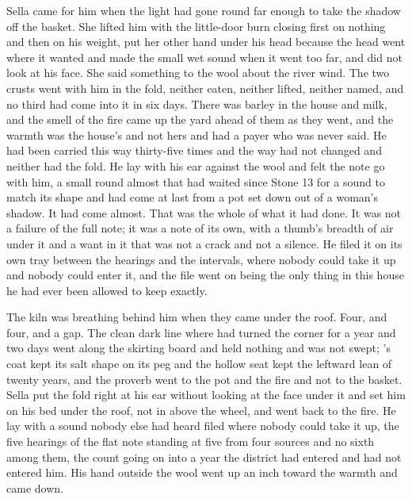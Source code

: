 Sella came for him when the light had gone round far enough to take the shadow off the basket. She lifted him with the little-door burn closing first on nothing and then on his weight, put her other hand under his head because the head went where it wanted and made the small wet sound when it went too far, and did not look at his face. She said something to the wool about the river wind. The two crusts went with him in the fold, neither eaten, neither lifted, neither named, and no third had come into it in six days. There was barley in the house and milk, and the smell of the fire came up the yard ahead of them as they went, and the warmth was the house's and not hers and had a payer who was never said. He had been carried this way thirty-five times and the way had not changed and neither had the fold. He lay with his ear against the wool and felt the note go with him, a small round almost that had waited since Stone 13 for a sound to match its shape and had come at last from a pot set down out of a woman's shadow. It had come almost. That was the whole of what it had done. It was not a failure of the full note; it was a note of its own, with a thumb's breadth of air under it and a want in it that was not a crack and not a silence. He filed it on its own tray between the hearings and the intervals, where nobody could take it up and nobody could enter it, and the file went on being the only thing in this house he had ever been allowed to keep exactly.

The kiln was breathing behind him when they came under the roof. Four, and four, and a gap. The clean dark line where  had turned the corner for a year and two days went along the skirting board and held nothing and was not swept; 's coat kept its salt shape on its peg and the hollow seat kept the leftward lean of twenty years, and the proverb went to the pot and the fire and not to the basket. Sella put the fold right at his ear without looking at the face under it and set him on his bed under the roof, not in  above the wheel, and went back to the fire. He lay with a sound nobody else had heard filed where nobody could take it up, the five hearings of the flat note standing at five from four sources and no sixth among them, the count going on into a year the district had entered and had not entered him. His hand outside the wool went up an inch toward the warmth and came down.
